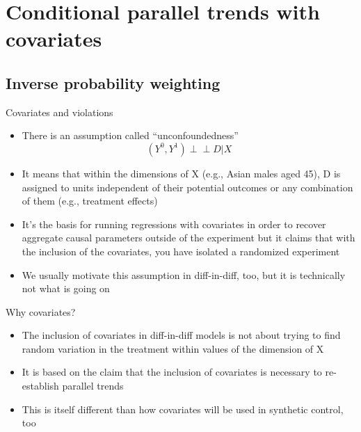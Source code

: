 \documentclass{beamer}
\begin{document}
\section{Conditional parallel trends with covariates}

\subsection{Inverse probability weighting}

\begin{frame}{Covariates and violations}

\begin{itemize}
\item There is an assumption called ``unconfoundedness'' $$( Y^0, Y^1 ) \perp\!\!\!\perp D | X $$
\item It means that within the dimensions of X (e.g., Asian males aged 45), D is assigned to units independent of their potential outcomes or any combination of them (e.g., treatment effects)
\item It's the basis for running regressions with covariates in order to recover aggregate causal parameters outside of the experiment but it claims that with the inclusion of the covariates, you have isolated a randomized experiment
\item We usually motivate this assumption in diff-in-diff, too, but it is technically not what is going on

\end{itemize}

\end{frame}

\begin{frame}{Why covariates?}

\begin{itemize}

\item The inclusion of covariates in diff-in-diff models is not about trying to find random variation in the treatment within values of the dimension of X
\item It is based on the claim that the inclusion of covariates is necessary to re-establish parallel trends
\item This is itself different than how covariates will be used in synthetic control, too
\end{itemize}

\end{frame}
\end{document}
